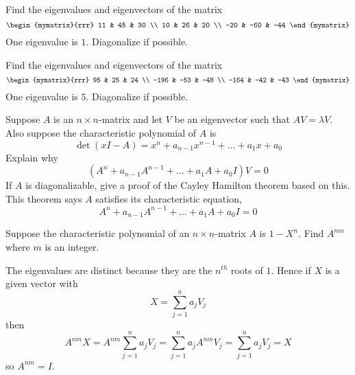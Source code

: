 \begin{enumialphparenastyle}
\begin{ex} Find the eigenvalues and eigenvectors of the matrix 
\begin{equation*}
\begin{mymatrix}{rrr}
11 & 45 & 30 \\
10 & 26 & 20 \\
-20 & -60 & -44
\end{mymatrix}
\end{equation*}
One eigenvalue is $1$. Diagonalize if possible.
\end{ex}

\begin{ex} Find the eigenvalues and eigenvectors of the matrix  
\begin{equation*}
\begin{mymatrix}{rrr}
95 & 25 & 24 \\
-196 & -53 & -48 \\
-164 & -42 & -43
\end{mymatrix}
\end{equation*}
One eigenvalue is $5$. Diagonalize if possible.
\end{ex}

\begin{ex} Suppose $A$ is an $n\times n$-matrix and let $V$ be an
eigenvector such that $AV=\lambda V$. Also suppose the
characteristic polynomial of $A$ is
\begin{equation*}
\det (x I-A) =x ^{n}+a_{n-1} x ^{n-1}+\ldots+a_{1}x +a_{0}
\end{equation*}
Explain why
\begin{equation*}
(A^{n}+a_{n-1}A^{n-1}+\ldots +a_{1}A+a_{0}I) V=0
\end{equation*}
If $A$ is diagonalizable, give a proof of the Cayley Hamilton
theorem based on this. This theorem says $A$ satisfies its
characteristic equation,
\begin{equation*}
A^{n}+a_{n-1}A^{n-1}+\ldots +a_{1}A+a_{0}I=0
\end{equation*} 
\end{ex}

\begin{ex} Suppose the characteristic polynomial of an $n\times n$-matrix $A$ is 
$1-X ^{n}$. Find $A^{mn}$ where $m$ is an integer. 
\begin{sol}
The eigenvalues are distinct because
they are the $n^{th}$ roots of $1$. Hence if $X$ is a given vector with
\[
X=\sum_{j=1}^{n}a_{j}V_{j}
\]
then
\[
A^{nm}X=A^{nm}\sum_{j=1}^{n}a_{j}V_{j}=
\sum_{j=1}^{n}a_{j}A^{nm}V_{j}=\sum_{j=1}^{n}a_{j}V_{j}=X
\]
so $A^{nm}=I$.
\end{sol}
\end{ex}

\end{enumialphparenastyle}
